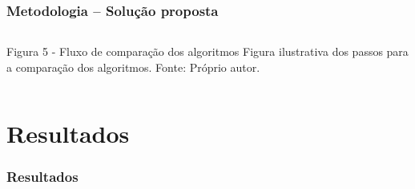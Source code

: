 \documentclass[aspectratio=169]{beamer}
\begin{document}
\begin{frame}[fragile]
	\frametitle{Metodologia -- Solução proposta}
		\begin{columns}[c]
			\begin{column}{1\linewidth}
				\begin{figure}
					\label{fig:proposta}
				\end{figure}

				\begin{block}{Figura 5 - Fluxo de comparação dos algoritmos}
					Figura ilustrativa dos passos para a comparação dos algoritmos. \newline Fonte: Próprio autor.    
				\end{block}
			\end{column}
		\end{columns}
	\end{frame}


\section{Resultados}

\begin{frame} \frametitle{Resultados}
\end{frame}
\end{document}
